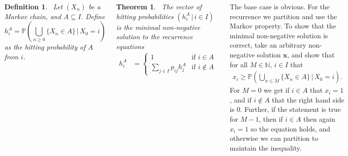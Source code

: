 \documentclass{tikzposter} %
\newtheorem{theorem}{Theorem}
\newtheorem{definition}{Definition}
\begin{document}
\begin{columns}
{  \begin{definition}
  \ Let $(X_{n})$ be a Markov chain, and $A \subseteq I$. Define
    \[h_{i}^{A} = \mathbb{P}\left(\bigcup_{n \ge 0} \{X_{n} \in A \} \,|\, X_{0} = i\right)\]
    as the hitting probability of $A$ from $i$.
  \end{definition}
  \hphantom{}

  \begin{theorem}
    \ The vector of hitting probabilities $(h^{A}_{i} \,|\, i \in I)$ is the minimal non-negative solution to the recurrence equations
    \begin{align*}
      h^{A}_{i} &= \begin{cases}
                     1 & \text{if $i \in A$} \\
                     \displaystyle \sum_{j \in I} p_{ij}h_{j}^{A} & \text{if $i \notin A$}
                  \end{cases}
    \end{align*}
  \end{theorem}
  \hphantom{}

  The base case is obvious. For the recurrence we partition and use the Markov property. To show that the minimal non-negative solution is correct, take an arbitrary non-negative solution $\bm{x}$, and show that for all $M \in \mathbb{N}$, $i \in I$ that
  \begin{align*}
    x_{i} \ge \mathbb{P}\left(\bigcup_{n \le M} \{X_{n} \in A\} \,|\, X_{0} = i\right).
  \end{align*}
  For $M = 0$ we get if $i \in A$ that $x_{i} = 1$, and if $i \notin A$ that the right hand side is $0$. Further, if the statement is true for $M-1$, then if $i \in A$ then again $x_{i} = 1$ so the equation holds, and otherwise we can partition to maintain the inequality. \\

  }
\end{columns}
\end{document}
